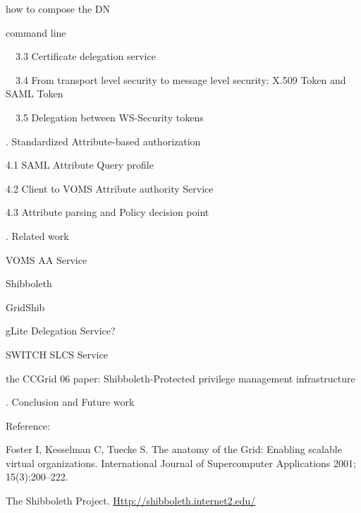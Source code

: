 \documentclass{article}
\begin{document}
\bigskip

how to compose the DN


\bigskip

command line


\bigskip


\bigskip


\bigskip

\ \ 3.3 Certificate delegation service


\bigskip


\bigskip

\ \ 3.4 From transport level security to message level security: X.509
Token and SAML Token


\bigskip


\bigskip

\ \ 3.5 Delegation between WS-Security tokens


\bigskip


\bigskip

{. Standardized Attribute-based authorization 
\par}


\bigskip

4.1 SAML Attribute Query profile


\bigskip

4.2 Client to VOMS Attribute authority Service


\bigskip

4.3 Attribute parsing and Policy decision point


\bigskip


\bigskip


\bigskip

{. Related work
\par}

VOMS AA Service

Shibboleth

GridShib

gLite Delegation Service?

SWITCH SLCS Service

the CCGrid 06 paper: Shibboleth-Protected privilege management
infrastructure


\bigskip


\bigskip

{. Conclusion and Future work
\par}


\bigskip


\bigskip

Reference:

Foster I, Kesselman C, Tuecke S. The anatomy of the Grid: Enabling
scalable virtual organizations. International Journal of Supercomputer
Applications 2001; 15(3):200--222. 


\bigskip

The Shibboleth Project.
\href{http://shibboleth.internet2.edu/}{Http://shibboleth.internet2.edu/}


\bigskip
\end{document}
